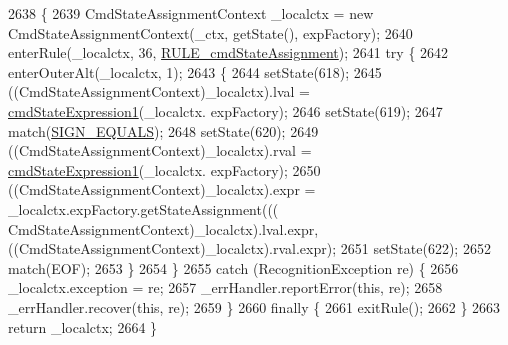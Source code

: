 \begin{DoxyCode}
2638                                                                                                            
                 \{
2639     CmdStateAssignmentContext \_localctx = \textcolor{keyword}{new} CmdStateAssignmentContext(\_ctx, getState(), expFactory);
2640     enterRule(\_localctx, 36, \hyperlink{classgov_1_1nasa_1_1jpf_1_1inspector_1_1server_1_1expression_1_1parser_1_1_expression_grammar_parser_a723ef4bbf69d5778d6c3ed45d5a3420f}{RULE\_cmdStateAssignment});
2641     \textcolor{keywordflow}{try} \{
2642       enterOuterAlt(\_localctx, 1);
2643       \{
2644       setState(618);
2645       ((CmdStateAssignmentContext)\_localctx).lval = \hyperlink{classgov_1_1nasa_1_1jpf_1_1inspector_1_1server_1_1expression_1_1parser_1_1_expression_grammar_parser_a1497794a3a59d8319803998a35dbb16e}{cmdStateExpression1}(\_localctx.
      expFactory);
2646       setState(619);
2647       match(\hyperlink{classgov_1_1nasa_1_1jpf_1_1inspector_1_1server_1_1expression_1_1parser_1_1_expression_grammar_parser_a4dc93cc6563a32e75e7006cb71acb7b7}{SIGN\_EQUALS});
2648       setState(620);
2649       ((CmdStateAssignmentContext)\_localctx).rval = \hyperlink{classgov_1_1nasa_1_1jpf_1_1inspector_1_1server_1_1expression_1_1parser_1_1_expression_grammar_parser_a1497794a3a59d8319803998a35dbb16e}{cmdStateExpression1}(\_localctx.
      expFactory);
2650        ((CmdStateAssignmentContext)\_localctx).expr =  \_localctx.expFactory.getStateAssignment(((
      CmdStateAssignmentContext)\_localctx).lval.expr, ((CmdStateAssignmentContext)\_localctx).rval.expr); 
2651       setState(622);
2652       match(EOF);
2653       \}
2654     \}
2655     \textcolor{keywordflow}{catch} (RecognitionException re) \{
2656       \_localctx.exception = re;
2657       \_errHandler.reportError(\textcolor{keyword}{this}, re);
2658       \_errHandler.recover(\textcolor{keyword}{this}, re);
2659     \}
2660     \textcolor{keywordflow}{finally} \{
2661       exitRule();
2662     \}
2663     \textcolor{keywordflow}{return} \_localctx;
2664   \}
\end{DoxyCode}
